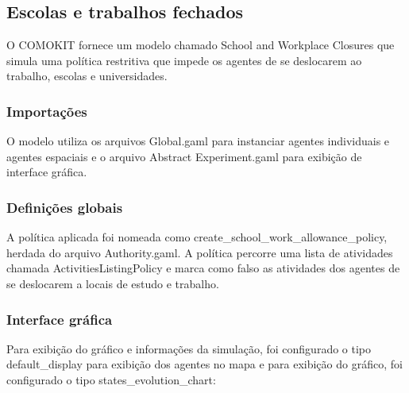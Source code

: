 

\subsection{Escolas e trabalhos fechados}

O COMOKIT fornece um modelo chamado School and Workplace Closures que simula uma política restritiva que impede os agentes de se deslocarem ao trabalho, escolas e universidades.


\subsubsection{Importações}

O modelo utiliza os arquivos Global.gaml para instanciar agentes individuais e agentes espaciais e o arquivo Abstract Experiment.gaml para exibição de interface gráfica.

\subsubsection{Definições globais}

A política aplicada foi nomeada como create\_school\_work\_allowance\_policy, herdada do arquivo Authority.gaml. A política percorre uma lista de atividades chamada ActivitiesListingPolicy e marca como falso as atividades dos agentes de se deslocarem a locais de estudo e trabalho.



\subsubsection{Interface gráfica}

Para exibição do gráfico e informações da simulação, foi configurado o tipo default\_display para exibição dos agentes no mapa e para exibição do gráfico, foi configurado o tipo states\_evolution\_chart:



